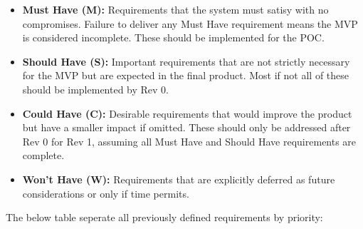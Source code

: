 \documentclass[12pt]{article}
\begin{document}
\begin{itemize}
  \item \textbf{Must Have (M):} Requirements that the system must satisy with no compromises.
    Failure to deliver any Must Have requirement means the MVP is considered incomplete. 
    These should be implemented for the POC.
  \item \textbf{Should Have (S):} Important requirements that are not strictly necessary for the
    MVP but are expected in the final product. Most if not all of these should be implemented by Rev 0. 
  \item \textbf{Could Have (C):} Desirable requirements that would improve the product but have
    a smaller impact if omitted. These should only be addressed after Rev 0 for Rev 1, assuming all Must Have and Should Have requirements are complete.
  \item \textbf{Won't Have (W):} Requirements that are explicitly deferred as future considerations or only if time permits.
\end{itemize}

The below table seperate all previously defined requirements by priority:
\end{document}
